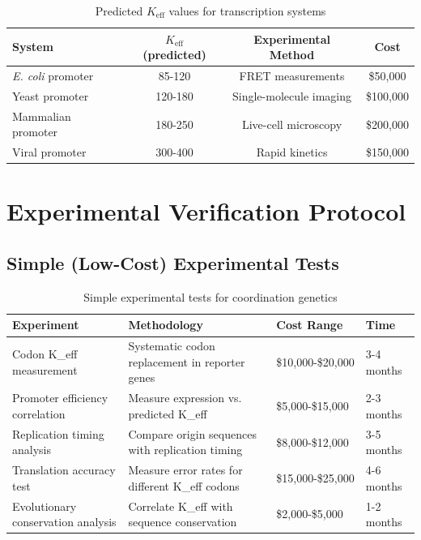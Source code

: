 \documentclass[12pt]{article}
\begin{document}
	\begin{table}[H]
		\centering
		\caption{Predicted $K_{\text{eff}}$ values for transcription systems}
		\begin{tabular}{lccc}
			\toprule
			\textbf{System} & \textbf{$K_{\text{eff}}$ (predicted)} & \textbf{Experimental Method} & \textbf{Cost} \\
			\midrule
			\textit{E. coli} promoter & 85-120 & FRET measurements & \$50,000 \\
			Yeast promoter & 120-180 & Single-molecule imaging & \$100,000 \\
			Mammalian promoter & 180-250 & Live-cell microscopy & \$200,000 \\
			Viral promoter & 300-400 & Rapid kinetics & \$150,000 \\
			\bottomrule
		\end{tabular}
	\end{table}
	
	\section{Experimental Verification Protocol}
	
	\subsection{Simple (Low-Cost) Experimental Tests}
	
	\begin{table}[H]
		\centering
		\caption{Simple experimental tests for coordination genetics}
		\begin{tabular}{p{4cm}p{5cm}p{3cm}p{2cm}}
			\toprule
			\textbf{Experiment} & \textbf{Methodology} & \textbf{Cost Range} & \textbf{Time} \\
			\midrule
			Codon K\_eff measurement & Systematic codon replacement in reporter genes & \$10,000-\$20,000 & 3-4 months \\
			Promoter efficiency correlation & Measure expression vs. predicted K\_eff & \$5,000-\$15,000 & 2-3 months \\
			Replication timing analysis & Compare origin sequences with replication timing & \$8,000-\$12,000 & 3-5 months \\
			Translation accuracy test & Measure error rates for different K\_eff codons & \$15,000-\$25,000 & 4-6 months \\
			Evolutionary conservation analysis & Correlate K\_eff with sequence conservation & \$2,000-\$5,000 & 1-2 months \\
			\bottomrule
		\end{tabular}
	\end{table}
	
\end{document}
